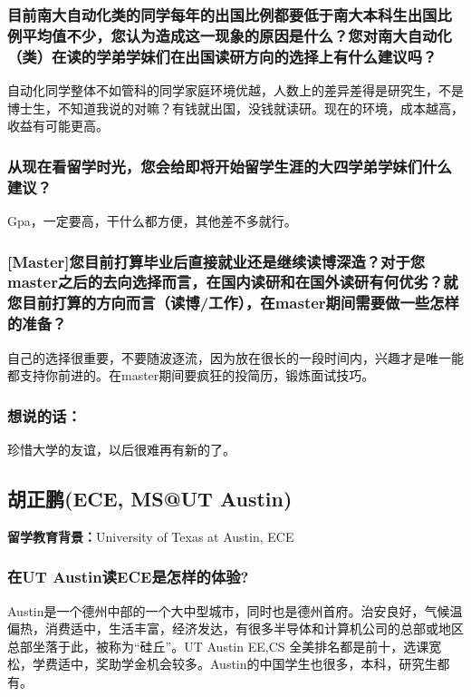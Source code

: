\documentclass[a4paper,UTF8]{book}
\begin{document}
    \subsubsection*{目前南大自动化类的同学每年的出国比例都要低于南大本科生出国比例平均值不少，您认为造成这一现象的原因是什么？您对南大自动化（类）在读的学弟学妹们在出国读研方向的选择上有什么建议吗？}
    自动化同学整体不如管科的同学家庭环境优越，人数上的差异差得是研究生，不是博士生，不知道我说的对嘛？有钱就出国，没钱就读研。现在的环境，成本越高，收益有可能更高。

    \subsubsection*{从现在看留学时光，您会给即将开始留学生涯的大四学弟学妹们什么建议？}
    Gpa，一定要高，干什么都方便，其他差不多就行。

    \subsubsection*{[Master]您目前打算毕业后直接就业还是继续读博深造？对于您master之后的去向选择而言，在国内读研和在国外读研有何优劣？就您目前打算的方向而言（读博/工作），在master期间需要做一些怎样的准备？}
    自己的选择很重要，不要随波逐流，因为放在很长的一段时间内，兴趣才是唯一能都支持你前进的。在master期间要疯狂的投简历，锻炼面试技巧。

    \subsubsection{想说的话：}
    珍惜大学的友谊，以后很难再有新的了。



\clearpage
\subsection{胡正鹏(ECE, MS@UT Austin)}
    \textbf{留学教育背景：}University of Texas at Austin, ECE

    \subsubsection*{在UT Austin读ECE是怎样的体验?}
    Austin是一个德州中部的一个大中型城市，同时也是德州首府。治安良好，气候温偏热，消费适中，生活丰富，经济发达，有很多半导体和计算机公司的总部或地区总部坐落于此，被称为“硅丘”。UT Austin EE,CS 全美排名都是前十，选课宽松，学费适中，奖助学金机会较多。Austin的中国学生也很多，本科，研究生都有。
\end{document}
